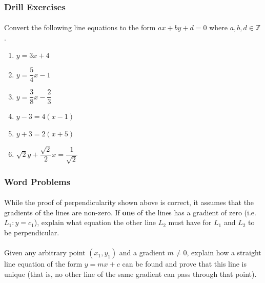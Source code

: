 \documentclass[12pt, a4paper, titlepage, twoside]{article}
\newcommand*{\Z}{\mathbb{Z}}
\begin{document}
	\subsubsection*{Drill Exercises}
	
	\paragraph{}
	 Convert the following line equations to the form $ax + by + d = 0$ where $a,b,d \in \Z$.
	
	\begin{multicols}{2}
		\begin{enumerate}[label=\textbf{(\alph*)}]
			\item $y = 3x + 4$
			\item $y = \dfrac{5}{4}x - 1$
			\item $y = \dfrac{3}{8}x - \dfrac{2}{3}$
			\item $y - 3 = 4(x-1)$
			\item $y + 3 = 2(x+5)$
			\item $\sqrt{2}y +\dfrac{\sqrt{2}}{2} x = \dfrac{1}{\sqrt{2}}$
		\end{enumerate}
	\end{multicols}
	
	\subsubsection*{Word Problems}	
	
	\paragraph{}
	 While the proof of perpendicularity shown above is correct, it assumes that the gradients of the
	lines are non-zero. If \textbf{one} of the lines has a gradient of zero (i.e. $L_1: y = c_1$), explain what equation the other line $L_2$ 
	must have for $L_1$ and $L_2$ to be perpendicular.
	
	\paragraph{}
	 Given any arbitrary point $(x_1, y_1)$ and a gradient $m \neq 0$, explain how a straight line
	equation of the form $y = mx + c$ can be found and prove that this line is unique (that is, no other line of the same gradient can
	pass through that point).
	
\end{document}
